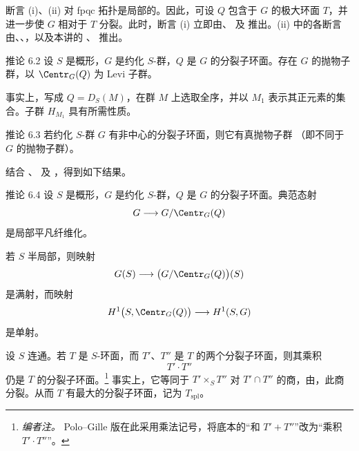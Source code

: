 断言 \textup{(i)}、\textup{(ii)} 对 fpqc 拓扑是局部的。因此，可设 \(Q\) 包含于 \(G\) 的极大环面 \(T\)，并进一步使 \(G\) 相对于 \(T\) 分裂。此时，断言 \textup{(i)} 立即由、 及  推出。\textup{(ii)} 中的各断言由、、，以及本讲的 、 推出。

\begin{sgastatement}{推论 6.2}
设 \(S\) 是概形，\(G\) 是约化 \(S\)-群，\(Q\) 是 \(G\) 的分裂子环面。存在 \(G\) 的抛物子群，以 \(\Centr_G(Q)\) 为 Levi 子群。
\end{sgastatement}

事实上，写成 \(Q=D_S(M)\)，在群 \(M\) 上选取全序，并以 \(M_1\) 表示其正元素的集合。子群 \(H_{M_1}\) 具有所需性质。

\begin{sgastatement}{推论 6.3}
若约化 \(S\)-群 \(G\) 有非中心的分裂子环面，则它有真抛物子群 \textup{（即不同于 \(G\) 的抛物子群）}。
\end{sgastatement}

结合 、 及 ，得到如下结果。

\begin{sgastatement}{推论 6.4}
设 \(S\) 是概形，\(G\) 是约化 \(S\)-群，\(Q\) 是 \(G\) 的分裂子环面。典范态射
\[
 G\longrightarrow G/\Centr_G(Q)
\]
是局部平凡纤维化。

若 \(S\) 半局部，则映射
\[
 G(S)\longrightarrow\bigl(G/\Centr_G(Q)\bigr)(S)
\]
是满射，而映射
\[
 H^1\bigl(S,\Centr_G(Q)\bigr)\longrightarrow H^1(S,G)
\]
是单射。
\end{sgastatement}


设 \(S\) 连通。若 \(T\) 是 \(S\)-环面，而 \(T'\)、\(T''\) 是 \(T\) 的两个分裂子环面，则其乘积
\[
 T'\cdot T''
\]
仍是 \(T\) 的分裂子环面。\footnote{\emph{编者注。} Polo--Gille 版在此采用乘法记号，将底本的“和 \(T'+T''\)”改为“乘积 \(T'\cdot T''\)”。}
事实上，它等同于 \(T'\times_S T''\) 对 \(T'\cap T''\) 的商，由，此商分裂。从而 \(T\) 有最大的分裂子环面，记为 \(T_{\mathrm{spl}}\)。

